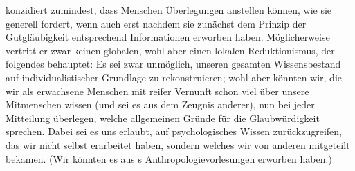  konzidiert zumindest, dass Menschen Überlegungen anstellen
können, wie  sie generell fordert, wenn auch erst nachdem sie zunächst dem
Prinzip der Gutgläubigkeit entsprechend Informationen erworben haben.
Möglicherweise vertritt er zwar keinen globalen, wohl aber einen lokalen
Reduktionismus, der folgendes behauptet: Es sei zwar unmöglich, unseren gesamten
Wissensbestand auf individualistischer Grundlage zu rekonstruieren; wohl aber
könnten wir, die wir als erwachsene Menschen mit reifer Vernunft schon viel über
unsere Mitmenschen wissen (und sei es aus dem Zeugnis anderer), nun bei jeder
Mitteilung überlegen, welche allgemeinen Gründe für die Glaubwürdigkeit
sprechen. Dabei sei es uns erlaubt, auf psychologisches Wissen zurückzugreifen,
das wir nicht selbst erarbeitet haben, sondern welches wir von
anderen mitgeteilt bekamen. (Wir könnten es aus
s Anthropologievorlesungen erworben
haben.)

